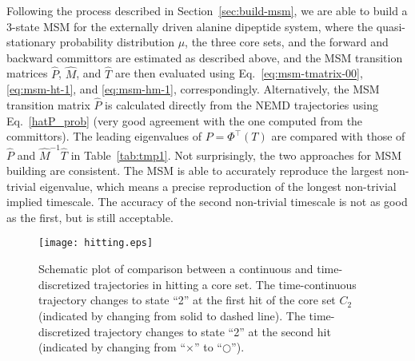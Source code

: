 \documentclass[journal=jctcce,manuscript=article]{achemso}
\newcommand{\myphi}{\Phi}
\begin{document}
Following the process described in Section~\ref{sec:build-msm}, we are able to build a 
3-state MSM for the externally driven alanine dipeptide system,
where the quasi-stationary probability distribution $\mu$, the three core sets, and the forward and backward committors are
estimated as described above, and the MSM transition matrices $\hat P$, $\hat{M}$, and $\hat{T}$ are then evaluated using Eq.~\eqref{eq:msm-tmatrix-00}, \eqref{eq:msm-ht-1}, and \eqref{eq:msm-hm-1}, correspondingly.
Alternatively, the MSM  transition matrix $\hat P$ is calculated directly from the NEMD trajectories using Eq.~\eqref{hatP_prob} (very good agreement with the one computed from the committors).
The leading eigenvalues of $P=\myphi^{\top}(T)$ are compared with those of $\hat P$ and $\hat{M}^{-1}\hat{T}$ in
Table~\ref{tab:tmp1}.
Not surprisingly, the two approaches for MSM building are consistent.
The MSM is able to accurately reproduce
the largest non-trivial eigenvalue, which means a precise reproduction
of the longest non-trivial implied timescale. The accuracy of the second non-trivial
timescale is not as good as the first, but is still acceptable.
\begin{figure}
  \centering
  \texttt{[image: hitting.eps]}
  \caption{Schematic plot of comparison between a continuous and time-discretized trajectories in hitting a core set.
    The time-continuous trajectory changes to state ``2'' at the first hit of the core set $C_2$ (indicated by changing from solid to dashed line).
    The time-discretized trajectory changes to state ``2'' at the second hit (indicated by changing from ``$\times$'' to ``$\Circle$'').
  }
  \label{fig:hitting}
\end{figure}
\end{document}
